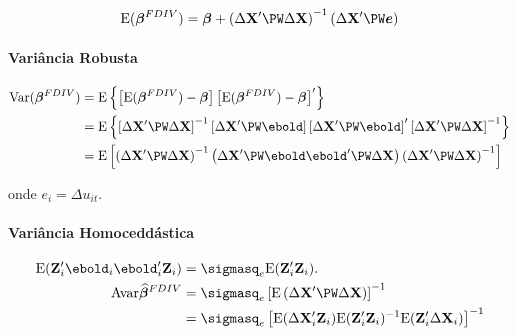 \documentclass[11pt, oneside, a4paper, article]{article}
\numberwithin{equation}{section}
\begin{document}
\begin{description}
\vspace{-1 em}
\begin{align*}
\E( \betavec^{FDIV} ) =  
\betavec + 
\left( \Delta \Xmat' \PW \Delta \Xmat \right)^{-1}
\left( \Delta \Xmat' \PW \mbs{e} \right)
\end{align*}

\paragraph{Variância Robusta}

\begin{center}
\end{center}

\vspace{-1 em}
\begin{align*}
\Var( \betavec^{FDIV} ) &=
\E\left\{  
\left[ \E( \betavec^{FDIV} ) - \betavec \right] 
\left[ \E( \betavec^{FDIV} ) - \betavec \right]'
\right\}
\\
&=
\E\left\{  
\left[ \Delta \Xmat' \PW \Delta \Xmat \right]^{-1}
\left[ \Delta \Xmat' \PW \ebold \right]
\left[ \Delta \Xmat' \PW \ebold \right]'
\left[ \Delta \Xmat' \PW \Delta \Xmat \right]^{-1}
\right\}
\\
&=
\E\left[
\left( \Delta \Xmat' \PW \Delta \Xmat \right)^{-1}
\left( \Delta \Xmat' \PW \ebold \ebold' \PW \Delta \Xmat \right)
\left( \Delta \Xmat' \PW \Delta \Xmat \right)^{-1}
\right]
\end{align*}

\noindent
onde
$e_{i} = \Delta u_{it}$.

\paragraph{Variância Homoceddástica}
\begin{align*}
\E(\Wmat_{i}' \ebold_{i} \ebold_{i}' \Wmat_{i}) &=
\sigmasq_{e} \E(\Wmat_{i}' \Wmat_{i}).
\\
\Avar{\betavechat^{FDIV}} &=
\sigmasq_{e} \left[ \E\left( \Delta \Xmat' \PW \Delta \Xmat \right) \right]^{-1}
\\ &=
\sigmasq_{e}
\left[
\E(\Delta\Xmat_{i}'\Wmat_{i})
\E(\Wmat_{i}'\Wmat_{i})^{-1}
\E(\Wmat_{i}'\Delta\Xmat_{i})
\right]^{-1}
\end{align*}


\end{description}
\end{document}
